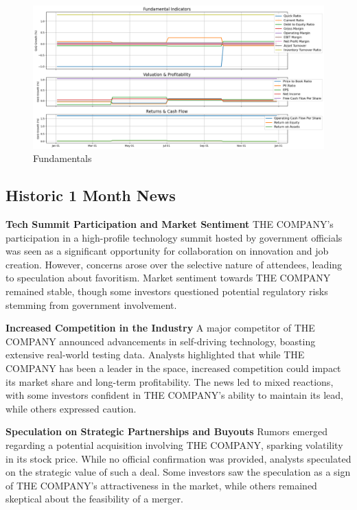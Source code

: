 \documentclass[8pt]{scrartcl}
\begin{document}
\begin{figure}[H]
    \centering
    \includegraphics[width=1\linewidth]{judge_reviews/GOOGL_M_gpt-4o-mini/2017-01-02/judge_Fundamental_Indicators.png}
    \caption{Fundamentals}
\end{figure}

\subsection*{Historic 1 Month News}

\textbf{Tech Summit Participation and Market Sentiment}
THE COMPANY's participation in a high-profile technology summit hosted by government officials was seen as a significant opportunity for collaboration on innovation and job creation. However, concerns arose over the selective nature of attendees, leading to speculation about favoritism. Market sentiment towards THE COMPANY remained stable, though some investors questioned potential regulatory risks stemming from government involvement.

\textbf{Increased Competition in the Industry}
A major competitor of THE COMPANY announced advancements in self-driving technology, boasting extensive real-world testing data. Analysts highlighted that while THE COMPANY has been a leader in the space, increased competition could impact its market share and long-term profitability. The news led to mixed reactions, with some investors confident in THE COMPANY’s ability to maintain its lead, while others expressed caution.

\textbf{Speculation on Strategic Partnerships and Buyouts}
Rumors emerged regarding a potential acquisition involving THE COMPANY, sparking volatility in its stock price. While no official confirmation was provided, analysts speculated on the strategic value of such a deal. Some investors saw the speculation as a sign of THE COMPANY's attractiveness in the market, while others remained skeptical about the feasibility of a merger.
\end{document}
